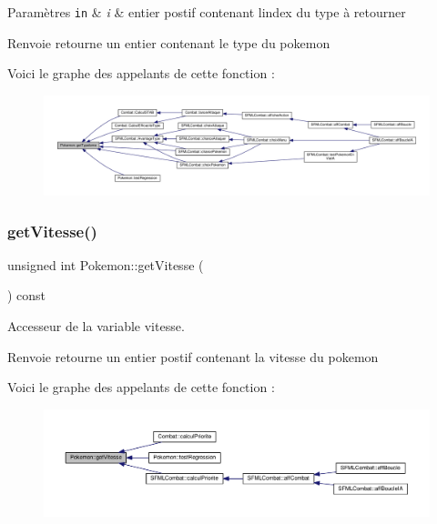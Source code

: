 \begin{DoxyParams}[1]{Paramètres}
\mbox{\tt in}  & {\em i} & entier postif contenant l\textquotesingle{}index du type à retourner \\
\hline
\end{DoxyParams}
\begin{DoxyReturn}{Renvoie}
retourne un entier contenant le type du pokemon 
\end{DoxyReturn}
Voici le graphe des appelants de cette fonction \+:\nopagebreak
\begin{figure}[H]
\begin{center}
\leavevmode
\includegraphics[width=350pt]{class_pokemon_a3d9cc7fe1b38d8d8ea3ef499116c0eac_icgraph}
\end{center}
\end{figure}
\mbox{\label{class_pokemon_a04a02b9ee3a43d25596b6d934ef861ba}} 
\subsubsection{\texorpdfstring{get\+Vitesse()}{getVitesse()}}
{\footnotesize\ttfamily unsigned int Pokemon\+::get\+Vitesse (\begin{DoxyParamCaption}{ }\end{DoxyParamCaption}) const}



Accesseur de la variable vitesse. 

\begin{DoxyReturn}{Renvoie}
retourne un entier postif contenant la vitesse du pokemon 
\end{DoxyReturn}
Voici le graphe des appelants de cette fonction \+:\nopagebreak
\begin{figure}[H]
\begin{center}
\leavevmode
\includegraphics[width=350pt]{class_pokemon_a04a02b9ee3a43d25596b6d934ef861ba_icgraph}
\end{center}
\end{figure}
\mbox{\label{class_pokemon_aa991f8c70046ffb8739bba5f09a6dd79}} 
